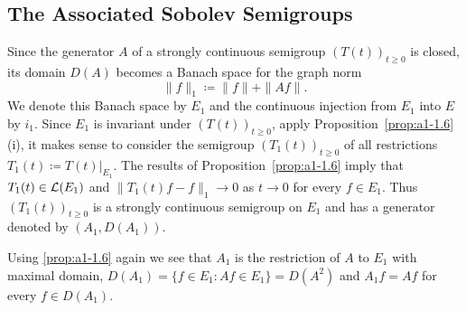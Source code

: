 \subsection{The Associated Sobolev Semigroups}\label{subsec:a1-3.6}%
Since the generator $A$ of a strongly continuous semigroup $(T(t))_{t\geq 0}$ is closed, its domain $D(A)$ becomes a Banach space for the graph norm
\[
    \|f\|_{1} \coloneqq \|f\| + \|Af\| .
\]
We denote this Banach space by $E_{1}$ and the continuous injection from $E_{1}$ into $E$ by $i_{1}$.
Since $E_{1}$ is invariant under $(T(t))_{t\geq 0}$, apply Proposition~\ref{prop:a1-1.6}\,(i), it makes sense to consider the semigroup $(T_{1}(t))_{t\geq 0}$ of all restrictions $T_{1}(t) \coloneqq T(t)|_{E_{1}}$.
The results of Proposition~\ref{prop:a1-1.6} imply that $T_{1}(t) \in \mathcal{L}(E_{1})$ and $\|T_{1}(t)f-f\|_{1} \to 0$ as $t \to 0$ for every $f \in E_{1}$.
Thus $(T_{1}(t))_{t\geq 0}$ is a strongly continuous semigroup on $E_{1}$ and has a generator denoted by $(A_{1},D(A_{1}))$.

Using \ref{prop:a1-1.6} again we see that $A_{1}$ is the restriction of $A$ to $E_{1}$ with maximal domain, \ie
$D(A_{1}) = \{f \in E_{1} \colon Af \in E_{1}\} = D(A^{2})$ and
$A_{1}f = Af$ for every $f \in D(A_{1})$.

